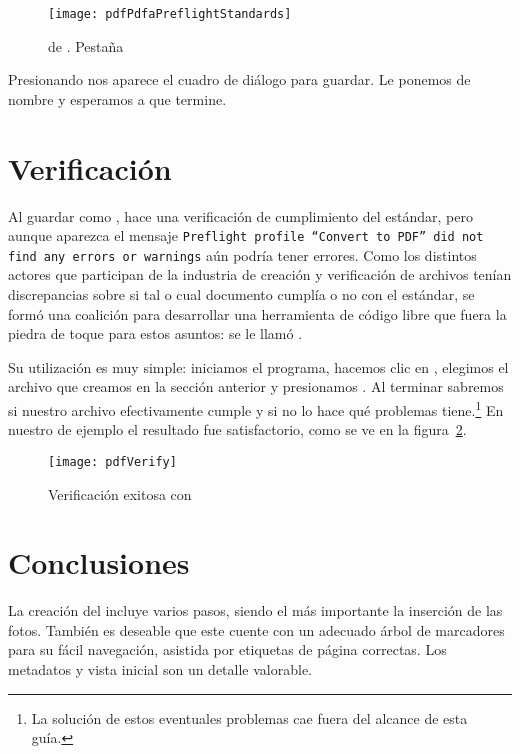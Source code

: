 \documentclass[%
	a5paper,
	10pt,
	twoside,
	openright,
	final,
]{memoir}
\begin{document}
{	\begin{figure}
		\texttt{[image: pdfPdfaPreflightStandards]}
		\caption[\texttt{Preflight} de \acrobat]{ de \acrobat. Pestaña \label{fig:pdfPdfaPreflightStandards}}
	\end{figure}

	Presionando  nos aparece el cuadro de diálogo para guardar. Le ponemos de nombre  y esperamos a que termine.

	\section{Verificación} Al guardar como \pdfa, \acrobat hace una verificación de cumplimiento del estándar, pero aunque aparezca el mensaje \texttt{Preflight profile ``Convert to PDF'' did not find any errors or warnings} aún podría tener errores. Como los distintos actores que participan de la industria de creación y verificación de archivos \pdfa tenían discrepancias sobre si tal o cual documento cumplía o no con el estándar, se formó una coalición para desarrollar una herramienta de código libre que fuera la piedra de toque para estos asuntos: se le llamó \veraPDF.

	Su utilización es muy simple: iniciamos el programa, hacemos clic en , elegimos el archivo que creamos en la sección anterior y presionamos . Al terminar sabremos si nuestro archivo efectivamente cumple y si no lo hace qué problemas tiene.\footnote{La solución de estos eventuales problemas cae fuera del alcance de esta guía.} En nuestro \pdf de ejemplo el resultado fue satisfactorio, como se ve en la figura~\ref{fig:pdfVerify}.

	\begin{figure}
		\texttt{[image: pdfVerify]}
		\caption{Verificación exitosa con \veraPDF\label{fig:pdfVerify}}
	\end{figure}

	\section{Conclusiones} La creación del \pdf incluye varios pasos, siendo el más importante la inserción de las fotos. También es deseable que este cuente con un adecuado árbol de marcadores para su fácil navegación, asistida por etiquetas de página correctas. Los metadatos y vista inicial son un detalle valorable.

}
\end{document}
